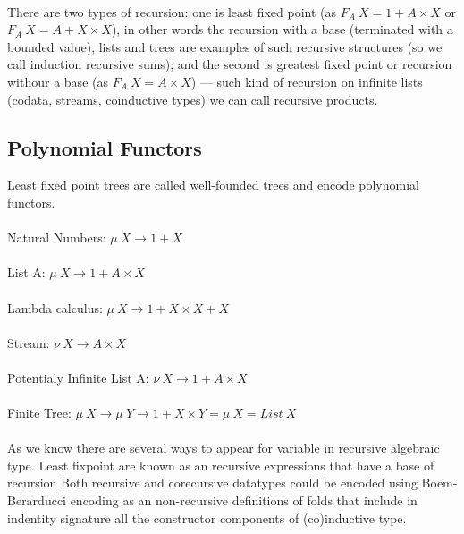 \documentclass[11pt,oneside]{article}
\begin{document}
  \paragraph{}
  There are two types of recursion: one is least fixed point (as $F_A\ X = 1 + A\times X$
  or $F_A\ X = A + X\times X$), in other words the recursion with a base (terminated with a bounded value),
  lists and trees are examples of such recursive structures (so we call induction recursive sums);
  and the second is greatest fixed point or recursion withour a base (as $F_A\ X = A\times X $) ---
  such kind of recursion on infinite lists (codata, streams, coinductive types) we can call recursive products.\\

  \subsection{Polynomial Functors}
  Least fixed point trees are called well-founded trees and encode polynomial functors.

  \paragraph{} Natural Numbers: $\mu\ X \rightarrow 1 + X$
  \paragraph{} List A: $\mu\ X \rightarrow 1 + A \times X$
  \paragraph{} Lambda calculus: $\mu\ X \rightarrow 1 + X \times X + X$
  \paragraph{} Stream: $\nu\ X \rightarrow A \times X$
  \paragraph{} Potentialy Infinite List A: $\nu\ X \rightarrow 1 + A \times X$
  \paragraph{} Finite Tree: $\mu\ X \rightarrow \mu\ Y \rightarrow 1 + X \times Y = \mu\ X = List\ X$

  \paragraph{}
  As we know there are several ways to appear for variable in recursive algebraic type.
  Least fixpoint are known as an recursive expressions that have a base of recursion
  Both recursive and corecursive datatypes could be encoded using Boem-Berarducci encoding
  as an non-recursive definitions of folds that include in indentity signature all the
  constructor components of (co)inductive type.
\end{document}
